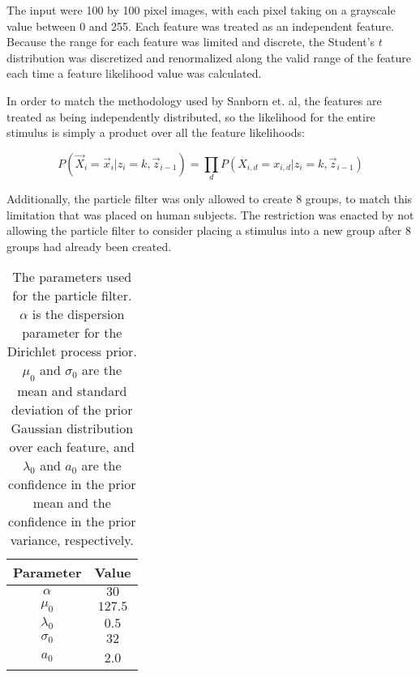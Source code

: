 The input were 100 by 100 pixel images, with each pixel taking on a grayscale
value between 0 and 255. Each feature was treated as an independent feature.
Because the range for each feature was limited and discrete, the Student's $t$
distribution was discretized and renormalized along the valid range of the
feature each time a feature likelihood value was calculated. 

In order to match the methodology used by Sanborn et. al, the features are
treated as being independently distributed, so the likelihood for the entire
stimulus is simply a product over all the feature likelihoods:

\begin{equation}
P(\vec{X}_i = \vec{x}_i | z_i = k,  \vec{z}_{i-1}) =  \prod_d P(X_{i,d} =
x_{i,d} | z_i = k,  \vec{z}_{i-1})
\end{equation}

Additionally, the particle filter was only allowed to create 8 groups, to match
this limitation that was placed on human subjects.  The restriction was enacted
by not allowing the particle filter to consider placing a stimulus into a new
group after 8 groups had already been created.

\begin{table}
\centering
\begin{tabular}{c | c}
Parameter & Value \\ \hline
$\alpha$ & $30$ \\
$\mu_0$ & $127.5$ \\
$\lambda_0$ & $0.5$ \\
$\sigma_0$ & $32$ \\
$a_0$ & 2.0 \\
\end{tabular}
\label{tab:parameters}
\caption{The parameters used for the particle filter. $\alpha$ is the dispersion
parameter for the Dirichlet process prior. $\mu_0$ and $\sigma_0$ are the mean
and standard deviation of the prior Gaussian distribution over each feature, and
$\lambda_0$ and $a_0$ are the confidence in the prior mean and the confidence in the
prior variance, respectively.}
\end{table}



